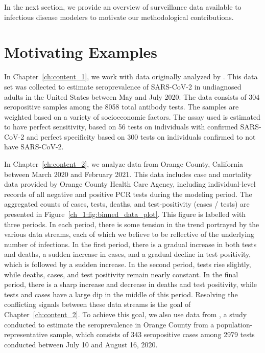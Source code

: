 In the next section, we provide an overview of surveillance data available to infectious disease modelers to motivate our methodological contributions.

\section{Motivating Examples}
\label{ch_1:sec:motivating_examples}

In Chapter~\ref{ch:content_1}, we work with data originally analyzed by \citet{Kali:2021}.
This data set was collected to estimate seroprevalence of SARS-CoV-2 in undiagnosed adults in the United States between May and July 2020.
The data consists of 304 seropositive samples among the 8058 total antibody tests.
The samples are weighted based on a variety of socioeconomic factors. 
 The assay used is estimated to have perfect sensitivity, based on 56 tests on individuals with confirmed SARS-CoV-2 and perfect specificity based on 300 tests on individuals confirmed to not have SARS-CoV-2.

In Chapter~\ref{ch:content_2}, we analyze data from Orange County, California between March 2020 and February 2021.
This data includes case and mortality data provided by Orange County Health Care Agency, including individual-level records of all negative and positive PCR tests during the modeling period.
The aggregated counts of cases, tests, deaths, and test-positivity (cases / tests) are presented in Figure~\ref{ch_1:fig:binned_data_plot}.
This figure is labelled with three periods.
In each period, there is some tension in the trend portrayed by the various data streams, each of which we believe to be reflective of the underlying number of infections.
In the first period, there is a gradual increase in both tests and deaths, a sudden increase in cases, and a gradual decline in test positivity, which is followed by a sudden increase.
In the second period, tests rise slightly, while deaths, cases, and test positivity remain nearly constant.
In the final period, there is a sharp increase and decrease in deaths and test positivity, while tests and cases have a large dip in the middle of this period.
Resolving the conflicting signals between these data streams is the goal of Chapter~\ref{ch:content_2}.
To achieve this goal, we also use data from \citet{Bruckner2021}, a study conducted to estimate the seroprevalence in Orange County from a population-representative sample, which consists of 343 seropositive cases among 2979 tests conducted between July 10 and August 16, 2020.

